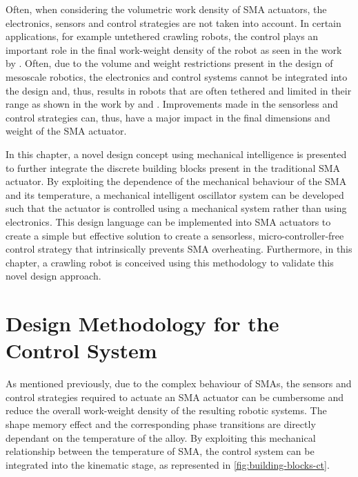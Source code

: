 Often, when considering the volumetric work density of SMA actuators, the electronics, sensors and control strategies are not taken into account. In certain applications, for example untethered crawling robots, the control plays an important role in the final work-weight density of the robot as seen in the work by \todocite. Often, due to the volume and weight restrictions present in the design of mesoscale robotics, the electronics and control systems cannot be integrated into the design and, thus, results in robots that are often tethered and limited in their range as shown in the work by \todocite and \todocite. Improvements made in the sensorless and control strategies can, thus, have a major impact in the final dimensions and weight of the SMA actuator.

In this chapter, a novel design concept using mechanical intelligence is presented to further integrate the discrete building blocks present in the traditional SMA actuator. By exploiting the dependence of the mechanical behaviour of the SMA and its temperature, a mechanical intelligent oscillator system can be developed such that the actuator is controlled using a mechanical system rather than using electronics. This design language can be implemented into SMA actuators to create a simple but effective solution to create a sensorless, micro-controller-free control strategy that intrinsically prevents SMA overheating. Furthermore, in this chapter, a crawling robot is conceived using this methodology to validate this novel design approach.

\section{Design Methodology for the Control System}
As mentioned previously, due to the complex behaviour of SMAs, the sensors and control strategies required to actuate an SMA actuator can be cumbersome and reduce the overall work-weight density of the resulting robotic systems. The shape memory effect and the corresponding phase transitions are directly dependant on the temperature of the alloy. By exploiting this mechanical relationship between the temperature of SMA, the control system can be integrated into the kinematic stage, as represented in \cref{fig:building-blocks-ct}.

